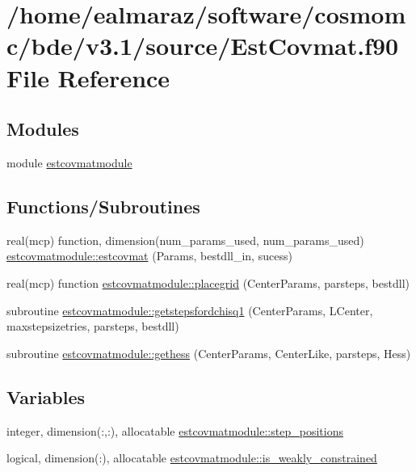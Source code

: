 \hypertarget{EstCovmat_8f90}{}\section{/home/ealmaraz/software/cosmomc/bde/v3.1/source/\+Est\+Covmat.f90 File Reference}
\label{EstCovmat_8f90}
\subsection*{Modules}
\begin{DoxyCompactItemize}
\item 
module \mbox{\hyperlink{namespaceestcovmatmodule}{estcovmatmodule}}
\end{DoxyCompactItemize}
\subsection*{Functions/\+Subroutines}
\begin{DoxyCompactItemize}
\item 
real(mcp) function, dimension(num\+\_\+params\+\_\+used, num\+\_\+params\+\_\+used) \mbox{\hyperlink{namespaceestcovmatmodule_afcc46985583aeb4fed0524e52dde8c8a}{estcovmatmodule\+::estcovmat}} (Params, bestdll\+\_\+in, sucess)
\item 
real(mcp) function \mbox{\hyperlink{namespaceestcovmatmodule_a2bc770f26c02a798aaf3ff8f2cc274aa}{estcovmatmodule\+::placegrid}} (Center\+Params, parsteps, bestdll)
\item 
subroutine \mbox{\hyperlink{namespaceestcovmatmodule_ac80cbfe7c3c7ed84526e57a069e41ccf}{estcovmatmodule\+::getstepsfordchisq1}} (Center\+Params, L\+Center, maxstepsizetries, parsteps, bestdll)
\item 
subroutine \mbox{\hyperlink{namespaceestcovmatmodule_a24745156f0a9a14a853ca7db8796afdc}{estcovmatmodule\+::gethess}} (Center\+Params, Center\+Like, parsteps, Hess)
\end{DoxyCompactItemize}
\subsection*{Variables}
\begin{DoxyCompactItemize}
\item 
integer, dimension(\+:,\+:), allocatable \mbox{\hyperlink{namespaceestcovmatmodule_a5e47ee3f7267aa3efec263340a8244fc}{estcovmatmodule\+::step\+\_\+positions}}
\item 
logical, dimension(\+:), allocatable \mbox{\hyperlink{namespaceestcovmatmodule_aae3649733742664790e565faa9dad010}{estcovmatmodule\+::is\+\_\+weakly\+\_\+constrained}}
\end{DoxyCompactItemize}
